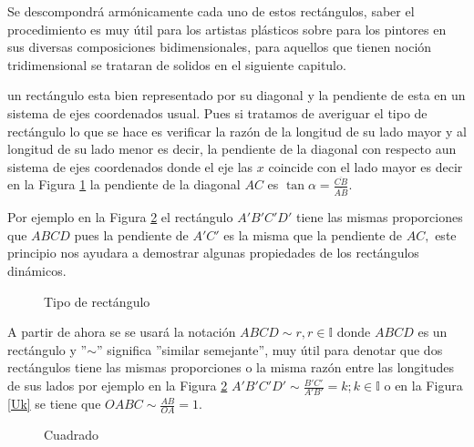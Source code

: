 Se descompondrá armónicamente cada uno de estos rectángulos, saber el procedimiento es muy útil para los artistas plásticos sobre para los pintores en sus diversas composiciones bidimensionales, para aquellos que tienen noción tridimensional  se trataran de solidos en el siguiente capitulo.

\begin{comen}\label{com1} un rectángulo esta bien representado por su diagonal y la pendiente de esta en un sistema de ejes coordenados usual. Pues si tratamos de averiguar el tipo de rectángulo  lo que se hace es verificar  la razón de la longitud de su lado mayor y al longitud de su lado menor es decir, la pendiente de la diagonal con respecto aun sistema de ejes coordenados donde el eje las $x$ coincide con el lado mayor es decir en la Figura \ref{Op} la pendiente de la diagonal $AC$ es $\tan{\alpha}=\frac{\overline{CB}}{\overline{AB}}.$

	Por ejemplo en la Figura \ref{Up} el rectángulo $A'B'C'D'$ tiene las mismas proporciones que $ABCD$ pues la pendiente de $A'C'$ es la misma que la pendiente de $AC,$ este principio nos ayudara a demostrar algunas propiedades de los rectángulos dinámicos.
	\begin{figure}[!ht]
		\begin{center}

		\end{center}
		\caption{Tipo de rectángulo}\label{Op}
	\end{figure}


\end{comen}



\begin{comen}
	A partir de ahora se se usará la notación $ABCD\sim r, r\in \mathbb{I}$ donde $ABCD$ es un rectángulo y ''$\sim$'' significa ''similar semejante'', muy útil  para denotar que dos rectángulos tiene las mismas proporciones o la misma razón entre las longitudes de sus lados  por ejemplo en la Figura \ref{Up} $A'B'C'D'\sim\frac{B'C'}{A'B'}=k; k\in \mathbb{I}$ o en la Figura \ref{Uk} se tiene que $OABC\sim\frac{AB}{OA}=1.$

	\begin{figure}[!ht]
		\begin{center}
		\end{center}
		\caption{Cuadrado}\label{Up}
	\end{figure}

\end{comen}

